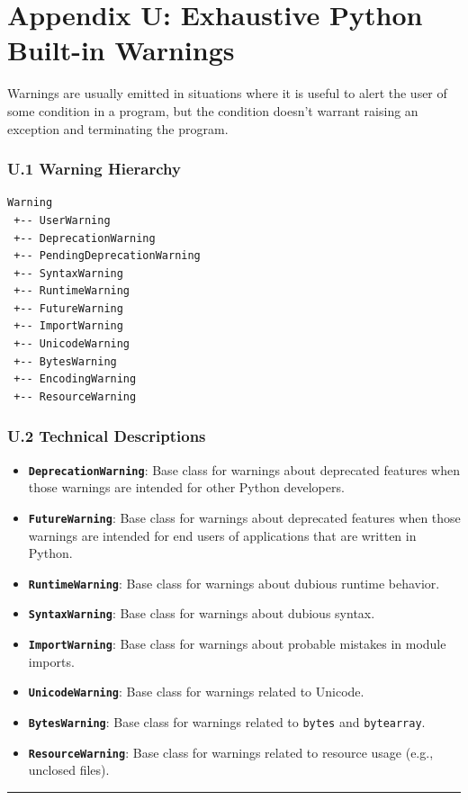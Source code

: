 \hypertarget{appendix-u-exhaustive-python-built-in-warnings}{%
\chapter{Appendix U: Exhaustive Python Built-in
Warnings}\label{appendix-u-exhaustive-python-built-in-warnings}}

Warnings are usually emitted in situations where it is useful to alert
the user of some condition in a program, but the condition doesn't
warrant raising an exception and terminating the program.

\hypertarget{u.1-warning-hierarchy}{%
\subsection{U.1 Warning Hierarchy}\label{u.1-warning-hierarchy}}

\begin{lstlisting}
Warning
 +-- UserWarning
 +-- DeprecationWarning
 +-- PendingDeprecationWarning
 +-- SyntaxWarning
 +-- RuntimeWarning
 +-- FutureWarning
 +-- ImportWarning
 +-- UnicodeWarning
 +-- BytesWarning
 +-- EncodingWarning
 +-- ResourceWarning
\end{lstlisting}

\hypertarget{u.2-technical-descriptions}{%
\subsection{U.2 Technical
Descriptions}\label{u.2-technical-descriptions}}

\begin{itemize}
\tightlist
\item
  \textbf{\passthrough{\lstinline!DeprecationWarning!}}: Base class for
  warnings about deprecated features when those warnings are intended
  for other Python developers.
\item
  \textbf{\passthrough{\lstinline!FutureWarning!}}: Base class for
  warnings about deprecated features when those warnings are intended
  for end users of applications that are written in Python.
\item
  \textbf{\passthrough{\lstinline!RuntimeWarning!}}: Base class for
  warnings about dubious runtime behavior.
\item
  \textbf{\passthrough{\lstinline!SyntaxWarning!}}: Base class for
  warnings about dubious syntax.
\item
  \textbf{\passthrough{\lstinline!ImportWarning!}}: Base class for
  warnings about probable mistakes in module imports.
\item
  \textbf{\passthrough{\lstinline!UnicodeWarning!}}: Base class for
  warnings related to Unicode.
\item
  \textbf{\passthrough{\lstinline!BytesWarning!}}: Base class for
  warnings related to \passthrough{\lstinline!bytes!} and
  \passthrough{\lstinline!bytearray!}.
\item
  \textbf{\passthrough{\lstinline!ResourceWarning!}}: Base class for
  warnings related to resource usage (e.g., unclosed files).
\end{itemize}

\begin{center}\rule{0.5\linewidth}{0.5pt}\end{center}
